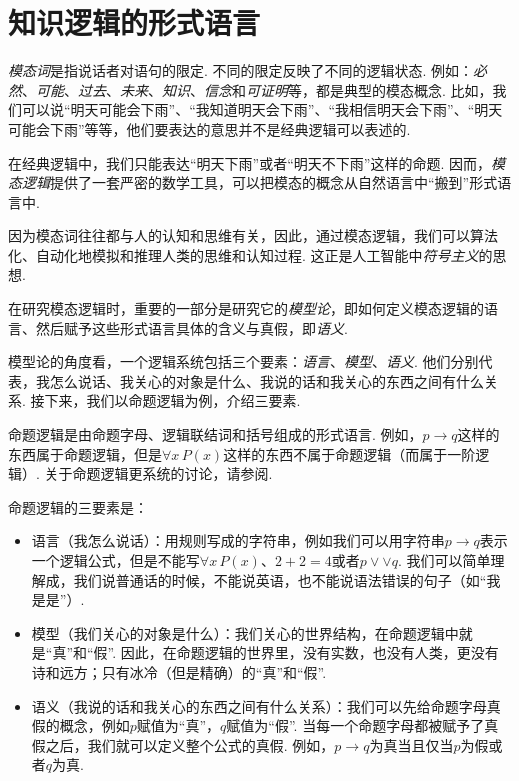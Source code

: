 \section{知识逻辑的形式语言}

\emph{模态词}是指说话者对语句的限定. 不同的限定反映了不同的逻辑状态. 例如：\emph{必然}、\emph{可能}、\emph{过去}、\emph{未来}、\emph{知识}、\emph{信念}和\emph{可证明}等，都是典型的模态概念. 比如，我们可以说“明天可能会下雨”、“我知道明天会下雨”、“我相信明天会下雨”、“明天可能会下雨”等等，他们要表达的意思并不是经典逻辑可以表述的. 

在经典逻辑中，我们只能表达“明天下雨”或者“明天不下雨”这样的命题. 因而，\emph{模态逻辑}提供了一套严密的数学工具，可以把模态的概念从自然语言中“搬到”形式语言中. 

因为模态词往往都与人的认知和思维有关，因此，通过模态逻辑，我们可以算法化、自动化地模拟和推理人类的思维和认知过程. 这正是人工智能中\emph{符号主义}的思想. 

在研究模态逻辑时，重要的一部分是研究它的\emph{模型论}，即如何定义模态逻辑的语言、然后赋予这些形式语言具体的含义与真假，即\emph{语义}. 

模型论的角度看，一个逻辑系统包括三个要素：\emph{语言}、\emph{模型}、\emph{语义}. 他们分别代表，我怎么说话、我关心的对象是什么、我说的话和我关心的东西之间有什么关系. 接下来，我们以命题逻辑为例，介绍三要素. 

\begin{example}[命题逻辑的逻辑三要素]
命题逻辑是由命题字母、逻辑联结词和括号组成的形式语言. 例如，$p\to q$这样的东西属于命题逻辑，但是$\forall x\, P(x)$这样的东西不属于命题逻辑（而属于一阶逻辑）. 关于命题逻辑更系统的讨论，请参阅. 

命题逻辑的三要素是：

\begin{itemize}
    \item 语言（我怎么说话）：用规则写成的字符串，例如我们可以用字符串$p\to q$表示一个逻辑公式，但是不能写$\forall x\, P(x)$、$2+2=4$或者$p\vee\vee q$. 我们可以简单理解成，我们说普通话的时候，不能说英语，也不能说语法错误的句子（如“我是是”）. 
    \item 模型（我们关心的对象是什么）：我们关心的世界结构，在命题逻辑中就是“真”和“假”. 因此，在命题逻辑的世界里，没有实数，也没有人类，更没有诗和远方；只有冰冷（但是精确）的“真”和“假”. 
    \item 语义（我说的话和我关心的东西之间有什么关系）：我们可以先给命题字母真假的概念，例如$p$赋值为“真”，$q$赋值为“假”. 当每一个命题字母都被赋予了真假之后，我们就可以定义整个公式的真假. 例如，$p\to q$为真当且仅当$p$为假或者$q$为真. 
\end{itemize}
\end{example}

